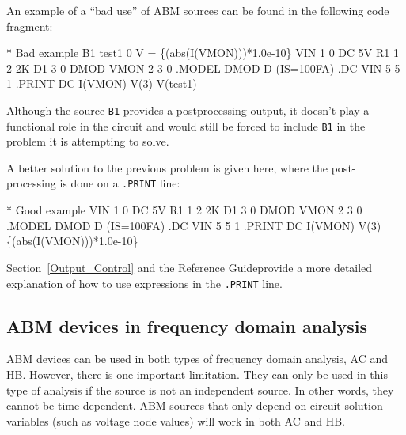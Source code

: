 An example of a ``bad use'' of ABM sources can be found in the
following code fragment:

\begin{vquote}
\color{blue}* Bad example
\color{XyceRed}B1 test1 0 V = \{(abs(I(VMON)))*1.0e-10\} \color{black}
VIN 1 0 DC 5V
R1 1 2 2K
D1 3 0 DMOD
VMON 2 3 0
.MODEL DMOD D (IS=100FA)
.DC VIN 5 5 1
.PRINT DC I(VMON) V(3) V(test1)
\end{vquote}

Although the source \texttt{B1} provides a 
postprocessing output, it doesn't play a functional role in the 
circuit and \Xyce{} would still be forced to include \texttt{B1} in 
the problem it is attempting to solve.  

A better solution to the previous problem is given here, where the
post-processing is done on a \verb|.PRINT| line:

\begin{vquote}
\color{blue}* Good example \color{black}
VIN 1 0 DC 5V
R1 1 2 2K
D1 3 0 DMOD
VMON 2 3 0
.MODEL DMOD D (IS=100FA)
.DC VIN 5 5 1
.PRINT DC I(VMON) V(3) \color{XyceRed} \{(abs(I(VMON)))*1.0e-10\} \color{black}
\end{vquote}

Section~\ref{Output_Control} and the \Xyce{} Reference
Guide\ReferenceGuide provide a more detailed explanation of how to use
expressions in the \texttt{.PRINT} line.

\subsection{ABM devices in frequency domain analysis}

ABM devices can be used in both types of frequency domain analysis, AC and HB.  
However, there is one important limitation.   They can only be used in this type of analysis 
if the source is not an independent source.  In other words, they cannot be time-dependent.
ABM sources that only depend on circuit solution variables (such as voltage node values) 
will work in both AC and HB.



